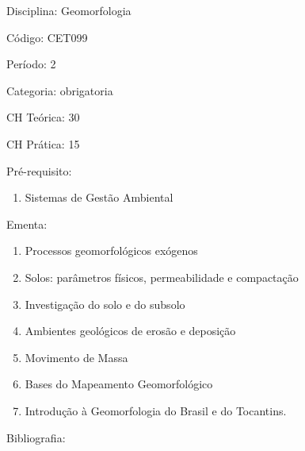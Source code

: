 \documentclass[12pt,a4paper,twoside]{report}
\begin{document}
Disciplina: Geomorfologia

Código: CET099

Período: 2

Categoria: obrigatoria

CH Teórica: 30

CH Prática: 15




Pré-requisito:
\begin{enumerate}
\item Sistemas de Gestão Ambiental
\end{enumerate}

Ementa:
\begin{enumerate}
\item Processos geomorfológicos exógenos
\item Solos: parâmetros físicos, permeabilidade e compactação
\item Investigação do solo e do subsolo
\item Ambientes geológicos de erosão e deposição
\item Movimento de Massa
\item Bases do Mapeamento Geomorfológico
\item Introdução à Geomorfologia do Brasil e do Tocantins.
\end{enumerate}



Bibliografia:
\end{document}
